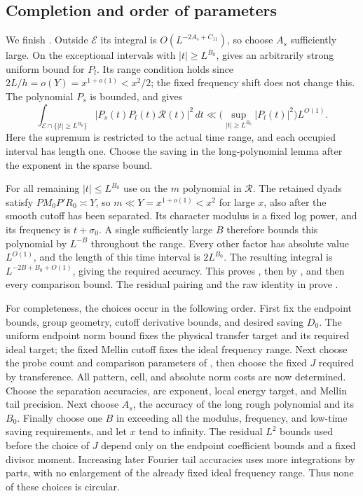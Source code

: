 \subsection{Completion and order of parameters}

We finish . Outside $\mathcal E$ its
integral is $O(L^{-2A_s+C_{11}})$, so choose $A_s$ sufficiently
large. On the exceptional intervals with $|t|\geq L^{B_0}$,
 gives an arbitrarily strong
uniform bound for $P_l$. Its range condition holds since
$2L/h=o(Y)=x^{1+o(1)}<x^2/2$; the fixed frequency shift does not
change this. The polynomial $P_s$ is bounded, and
 gives
\[
 \int_{\mathcal E\cap\{|t|\geq L^{B_0}\}}
           |P_s(t)P_l(t)\mathcal R(t)|^2\,dt
 \ll \bigl(\sup_{|t|\geq L^{B_0}}|P_l(t)|^2\bigr)L^{O(1)}.
\]
Here the supremum is restricted to the actual time range, and
each occupied interval has length one. Choose the saving in the
long-polynomial lemma after the exponent in the sparse bound.

For all remaining $|t|\leq L^{B_0}$ use
 on the $m$ polynomial in $\mathcal R$.
The retained dyads satisfy $PM_0P'R_0\asymp Y$, so
$m\ll Y=x^{1+o(1)}<x^2$ for large $x$, also after the smooth
cutoff has been separated. Its character modulus is a fixed
log power, and its frequency is $t+\sigma_0$. A single sufficiently
large $B$ therefore bounds this polynomial by $L^{-B}$ throughout
the range. Every other factor has absolute value $L^{O(1)}$, and
the length of this time interval is $2L^{B_0}$. The resulting
integral is $L^{-2B+B_0+O(1)}$, giving the required accuracy.
This proves , then
 by ,
and then every comparison bound. The residual pairing and the
raw identity in  prove
.

For completeness, the choices occur in the following order.
First fix the endpoint bounds, group geometry, cutoff derivative
bounds, and desired saving $D_0$. The uniform endpoint norm bound
fixes the physical transfer target and its required ideal target;
the fixed Mellin cutoff fixes the ideal frequency range. Next choose
the probe count and comparison parameters of ,
then choose the fixed $J$ required by transference. All pattern,
cell, and absolute norm costs are now determined. Choose the
separation accuracies, arc exponent, local energy target, and
Mellin tail precision. Next choose $A_s$, the accuracy of the
long rough polynomial and its $B_0$. Finally choose one $B$ in
 exceeding all the modulus, frequency, and
low-time saving requirements, and let $x$ tend to infinity.
The residual $L^2$ bounds used before the choice of $J$ depend only
on the endpoint coefficient bounds and a fixed divisor moment.
Increasing later Fourier tail accuracies uses more integrations
by parts, with no enlargement of the already fixed ideal frequency
range. Thus none of these choices is circular.
